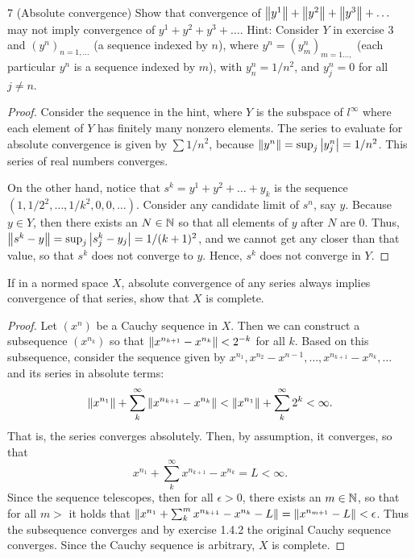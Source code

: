 \begin{exercise}{7 (Absolute convergence)}
Show that convergence of $\left\lVert y^1\right\rVert+\left\lVert y^2\right\rVert+\left\lVert y^3\right\rVert+\dots$ may not imply convergence of $y^1+y^2+y^3+\dots$. Hint: Consider $Y$ in exercise 3 and $(y^n)_{n=1,\dots}$ (a sequence indexed by $n$), where $y^n=(y^n_m)_{m=1\dots,}$ (each particular $y^n$ is a sequence indexed by $m$), with $y^n_n=1/n^2$, and $y^n_j=0$ for all $j\neq n$.
\end{exercise}
\begin{proof}
Consider the sequence in the hint, where $Y$ is the subspace of $l^\infty$ where each element of $Y$ has finitely many nonzero elements. The series to evaluate for absolute convergence is given by $\sum 1/n^2$, because $\left\lVert y^n\right\rVert=\sup_j\left\lvert y^n_j\right\rvert=1/n^2$. This series of real numbers converges. 

On the other hand, notice that $s^k=y^1+y^2+\dots+y_k$ is the sequence $(1,1/2^2,\dots,1/k^2,0,0,\dots)$. Consider any candidate limit of $s^n$, say $y$. Because $y\in Y$, then there exists an $N\in\mathbb{N}$ so that all elements of $y$ after $N$ are 0. Thus, $\left\lVert s^k-y\right\rVert=\sup_j\left\lvert s^k_j-y_j\right\rvert=1/(k+1)^2$, and we cannot get any closer than that value, so that $s^k$ does not converge to $y$. Hence, $s^k$ does not converge in $Y$.
\end{proof}

\begin{exercise}{8}
If in a normed space $X$, absolute convergence of any series always implies convergence of that series, show that $X$ is complete.
\end{exercise}
\begin{proof}
Let $(x^n)$ be a Cauchy sequence in $X$. Then we can construct a subsequence $(x^{n_k})$ so that $\left\lVert x^{n_{k+1}}-x^{n_k}\right\rVert<2^{-k}$ for all $k$. Based on this subsequence, consider the sequence given by $x^{n_1}, x^{n_2}-x^{n-1},\dots,x^{n_{k+1}}-x^{n_k},\dots$ and its series in absolute terms:
\[
\left\lVert x^{n_1}\right\rVert + \sum_k^\infty \left\lVert x^{n_{k+1}}-x^{n_k}\right\rVert
< \left\lVert x^{n_1}\right\rVert + \sum_k^\infty 2^k
< \infty.
\]
That is, the series converges absolutely. Then, by assumption, it converges, so that 
\[
x^{n_1} + \sum_k^\infty x^{n_{k+1}}-x^{n_k}
= L <\infty.
\]
Since the sequence telescopes, then for all $\epsilon>0$, there exists an $m\in\mathbb{N}$, so that for all $m>$ it holds that $\left\lVert x^{n_1} + \sum_k^m x^{n_{k+1}}-x^{n_k} - L\right\rVert =\left\lVert x^{n_{m+1}}-L\right\rVert<\epsilon$. Thus the subsequence converges and by exercise 1.4.2 the original Cauchy sequence converges. Since the Cauchy sequence is arbitrary, $X$ is complete.
\end{proof}

